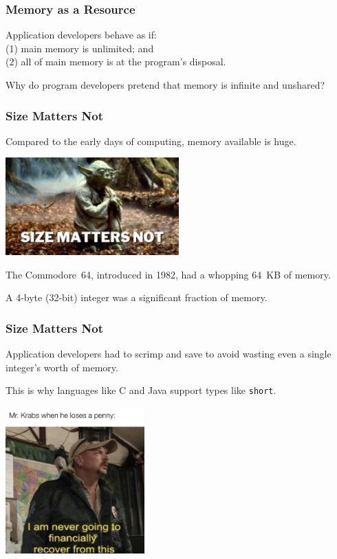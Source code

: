 \begin{frame}
\frametitle{Memory as a Resource}

Application developers behave as if:\\
\quad (1) main memory is unlimited; and \\
\quad (2) all of main memory is at the program's disposal. 


Why do program developers pretend that memory is infinite and unshared?

\end{frame}

\begin{frame}
\frametitle{Size Matters Not}

Compared to the early days of computing, memory available is huge. 

\begin{center}
	\includegraphics[width=0.5\textwidth]{images/yoda.jpg}
\end{center}


The Commodore~64, introduced in 1982, had a whopping 64~KB of memory. 

A 4-byte (32-bit) integer was a significant fraction of memory. 

\end{frame}

\begin{frame}
\frametitle{Size Matters Not}

Application developers had to scrimp and save to avoid wasting even a single integer's worth of memory. 

This is why languages like C and Java support types like \texttt{short}.

\begin{center}
	\includegraphics[width=0.4\textwidth]{images/pennypincher.jpg}
\end{center}

\end{frame}

